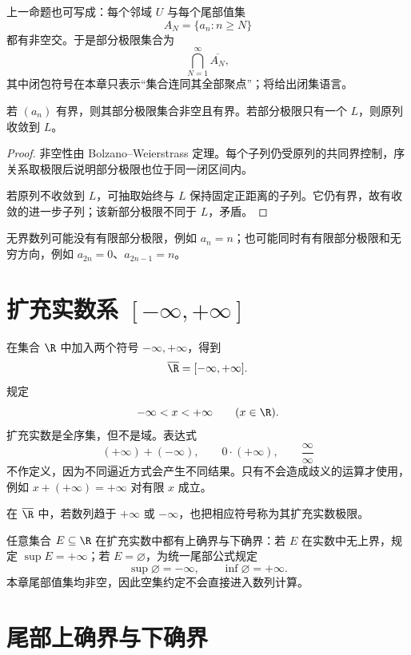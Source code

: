 上一命题也可写成：每个邻域 \(U\) 与每个尾部值集
\[
 A_N=\{a_n:n\ge N\}
\]
都有非空交。于是部分极限集合为
\[
 \bigcap_{N=1}^{\infty}\overline{A_N},
\]
其中闭包符号在本章只表示“集合连同其全部聚点”；将给出闭集语言。

\begin{theorem}
若 \((a_n)\) 有界，则其部分极限集合非空且有界。若部分极限只有一个 \(L\)，则原列收敛到 \(L\)。
\end{theorem}

\begin{proof}
非空性由 Bolzano--Weierstrass 定理。每个子列仍受原列的共同界控制，序关系取极限后说明部分极限也位于同一闭区间内。

若原列不收敛到 \(L\)，可抽取始终与 \(L\) 保持固定正距离的子列。它仍有界，故有收敛的进一步子列；该新部分极限不同于 \(L\)，矛盾。
\end{proof}

无界数列可能没有有限部分极限，例如 \(a_n=n\)；也可能同时有有限部分极限和无穷方向，例如 \(a_{2n}=0\)、\(a_{2n-1}=n\)。

\section{扩充实数系 \texorpdfstring{\([-\infty,+\infty]\)}{[-infinity,+infinity]}}

在集合 \(\R\) 中加入两个符号 \(-\infty,+\infty\)，得到
\[
 \overline{\R}=[-\infty,+\infty].
\]
规定
\[
 -\infty<x<+\infty\qquad(x\in\R).
\]
扩充实数是全序集，但不是域。表达式
\[
 (+\infty)+(-\infty),\qquad 0\cdot(+\infty),\qquad
 \frac{\infty}{\infty}
\]
不作定义，因为不同逼近方式会产生不同结果。只有不会造成歧义的运算才使用，例如 \(x+(+\infty)=+\infty\) 对有限 \(x\) 成立。

\begin{definition}
在 \(\overline{\R}\) 中，若数列趋于 \(+\infty\) 或 \(-\infty\)，也把相应符号称为其扩充实数极限。
\end{definition}

任意集合 \(E\subseteq\R\) 在扩充实数中都有上确界与下确界：若 \(E\) 在实数中无上界，规定 \(\sup E=+\infty\)；若 \(E=\varnothing\)，为统一尾部公式规定
\[
 \sup\varnothing=-\infty,\qquad
 \inf\varnothing=+\infty.
\]
本章尾部值集均非空，因此空集约定不会直接进入数列计算。

\section{尾部上确界与下确界}

